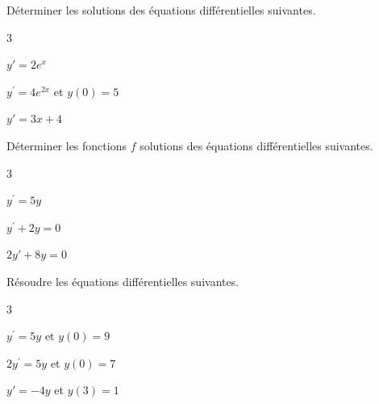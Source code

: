 \documentclass[11pt,a4paper]{article}  %
\begin{document}

Déterminer les solutions des équations différentielles suivantes.
\begin{multicols}{3}
	\begin{enumMet}
		\item {} $y'=2e^x$
		\item $y^{\prime}=4 e^{2 x}$ et $y(0)=5$
		\item $y'=3x+4$
	\end{enumMet}
\end{multicols}


Déterminer les fonctions $f$ solutions des équations différentielles suivantes.
\begin{multicols}{3}
	\begin{enumMet}
		\item {} $y^{\prime}=5 y$
		\item {} $y^{\prime}+2y=0$
		\item $2y'+8 y=0$
	\end{enumMet}
\end{multicols}


Résoudre les équations différentielles suivantes.
\begin{multicols}{3}
	\begin{enumMet}
		\item $y^{\prime}=5y$ et $y(0)=9$
		\item $2y^{\prime}=5 y$ et $y(0)=7$
		\item $y'=-4 y$ et $y(3)=1$
	\end{enumMet}
\end{multicols}
	
\end{document}

